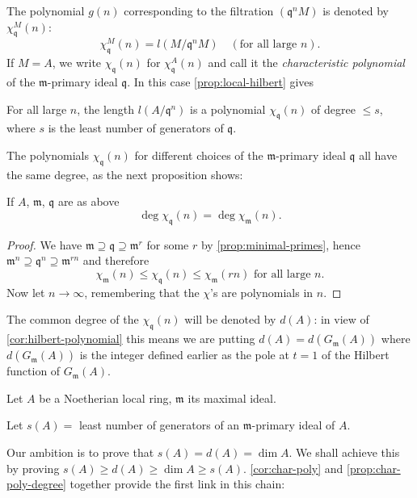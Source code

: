 The polynomial $g(n)$ corresponding to the filtration $(\mathfrak{q}^n M)$ is denoted by $\chi_{\mathfrak{q}}^M(n)$:
\[
    \chi_{\mathfrak{q}}^M(n) = l(M/\mathfrak{q}^n M) \quad (\text{for all large } n).
\]
If $M = A$, we write $\chi_{\mathfrak{q}}(n)$ for $\chi_{\mathfrak{q}}^A(n)$ and call it the \emph{characteristic polynomial} of the $\mathfrak{m}$-primary ideal $\mathfrak{q}$. In this case \eqref{prop:local-hilbert} gives

\begin{corollary}\label{cor:char-poly}
For all large $n$, the length $l(A/\mathfrak{q}^n)$ is a polynomial $\chi_{\mathfrak{q}}(n)$ of degree $\leq s$, where $s$ is the least number of generators of $\mathfrak{q}$.
\end{corollary}

The polynomials $\chi_{\mathfrak{q}}(n)$ for different choices of the $\mathfrak{m}$-primary ideal $\mathfrak{q}$ all have the same degree, as the next proposition shows:

\begin{proposition}\label{prop:char-poly-degree}
If $A$, $\mathfrak{m}$, $\mathfrak{q}$ are as above
\[
    \deg \chi_{\mathfrak{q}}(n) = \deg \chi_{\mathfrak{m}}(n).
\]
\end{proposition}

\begin{proof}
We have $\mathfrak{m} \supseteq \mathfrak{q} \supseteq \mathfrak{m}^r$ for some $r$ by \eqref{prop:minimal-primes}, hence $\mathfrak{m}^n \supseteq \mathfrak{q}^n \supseteq \mathfrak{m}^{rn}$ and therefore
\[
    \chi_{\mathfrak{m}}(n) \leq \chi_{\mathfrak{q}}(n) \leq \chi_{\mathfrak{m}}(rn) \text{ for all large } n.
\]
Now let $n \to \infty$, remembering that the $\chi$'s are polynomials in $n$.
\end{proof}

The common degree of the $\chi_{\mathfrak{q}}(n)$ will be denoted by $d(A)$: in view of \eqref{cor:hilbert-polynomial} this means we are putting $d(A) = d(G_{\mathfrak{m}}(A))$ where $d(G_{\mathfrak{m}}(A))$ is the integer defined earlier as the pole at $t = 1$ of the Hilbert function of $G_{\mathfrak{m}}(A)$.

Let $A$ be a Noetherian local ring, $\mathfrak{m}$ its maximal ideal.

Let $s(A) = $ least number of generators of an $\mathfrak{m}$-primary ideal of $A$.

Our ambition is to prove that $s(A) = d(A) = \dim A$. We shall achieve this by proving $s(A) \geq d(A) \geq \dim A \geq s(A)$. \eqref{cor:char-poly} and \eqref{prop:char-poly-degree} together provide the first link in this chain:

